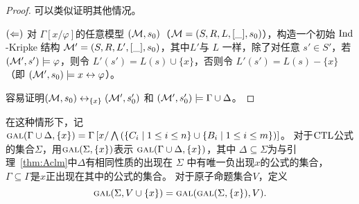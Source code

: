 \begin{proof}
	可以类似证明其他情况。
	
	
	$(\Leftarrow)$ 对 $\Gamma\left[x/\varphi \right]$的任意模型 $({\cal M}, s_0)$（${\cal M} = (S, R, L,[\_], s_0)$），构造一个初始 $\textrm{Ind}$-Kripke 结构 ${\cal M}'=(S, R, L',[\_], s_0)$，其中$L'$与 $L$ 一样，除了对任意 $s'\in S'$，若 $({\cal M}', s') \models \varphi$，则令 $L'(s') = L(s) \cup \{x\}$，否则令 $L'(s') = L(s)-\{x\}$ （即 $({\cal M}', s_0) \models x \leftrightarrow \varphi$）。
	
	容易证明$({\cal M},s_0) \leftrightarrow_{\{x\}} ({\cal M}', s_0')$ 和 $({\cal M}',s_0') \models \Gamma \cup \Delta$。
\end{proof}


在这种情形下，记 $\textsc{gal}(\Gamma\cup\Delta,\{x\})=\Gamma\left[x/\bigwedge\left(\{C_i\mid 1\le i\le n\}\cup\{B_i\mid 1\le i\le m\}\right)\right]$。
%
对于$\textrm{CTL}$公式的集合$\Sigma$，用$\textsc{gal}(\Sigma,\{x\})$表示 $\textsc{gal}(\Gamma\cup\Delta,\{x\})$，其中 $\Delta\subseteq\Sigma$为与引理~\ref{thm:Aclm}中$\Delta$有相同性质的出现在 $\Sigma$ 中有唯一负出现$x$的公式的集合， $\Gamma\subseteq \Gamma$是$x$正出现在其中的公式的集合。 
对于原子命题集合$V$，定义
$$\textsc{gal}(\Sigma,V\cup\{x\})=\textsc{gal}(\textsc{gal}(\Sigma,\{x\}),V).$$

